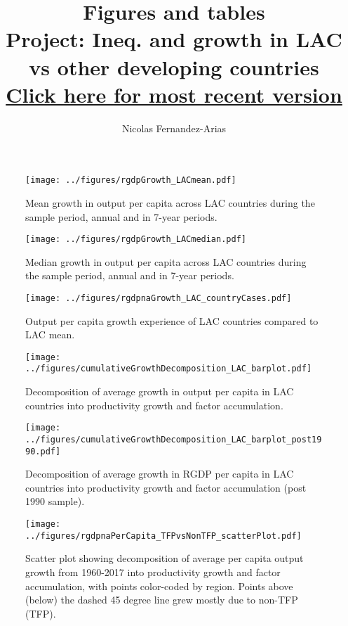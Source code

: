 \documentclass[12pt,english]{article}
\theoremstyle{remark}
\begin{document}
	
\title{Figures and tables\\ \small Project: Ineq. and growth in LAC vs other developing countries \\ \href{https://drive.google.com/open?id=1scBTr_BbYT9DM73woQAA136QVIfP6-Jr}{Click here for most recent version}}
\author{Nicolas Fernandez-Arias}
\maketitle

\begin{sidewaysfigure}[ht]
	\texttt{[image: ../figures/rgdpGrowth\_LACmean.pdf]}
	\caption{Mean growth in output per capita across LAC countries during the sample period, annual and in 7-year periods.}
\end{sidewaysfigure}

\begin{sidewaysfigure}[ht]
	\texttt{[image: ../figures/rgdpGrowth\_LACmedian.pdf]}
	\caption{Median growth in output per capita across LAC countries during the sample period, annual and in 7-year periods.}
\end{sidewaysfigure}

\begin{sidewaysfigure}[ht]
	\texttt{[image: ../figures/rgdpnaGrowth\_LAC\_countryCases.pdf]}
	\caption{Output per capita growth experience of LAC countries compared to LAC mean.}
\end{sidewaysfigure}

\begin{sidewaysfigure}[ht]
	\texttt{[image: ../figures/cumulativeGrowthDecomposition\_LAC\_barplot.pdf]}
	\caption{Decomposition of average growth in output per capita in LAC countries into productivity growth and factor accumulation.}
\end{sidewaysfigure}

\begin{sidewaysfigure}[ht]
	\texttt{[image: ../figures/cumulativeGrowthDecomposition\_LAC\_barplot\_post1990.pdf]}
	\caption{Decomposition of average growth in RGDP per capita in LAC countries into productivity growth and factor accumulation (post 1990 sample).}
\end{sidewaysfigure}

\begin{sidewaysfigure}[ht]
	\texttt{[image: ../figures/rgdpnaPerCapita\_TFPvsNonTFP\_scatterPlot.pdf]}
	\caption{Scatter plot showing decomposition of average per capita output growth from 1960-2017 into productivity growth and factor accumulation, with points color-coded by region. Points above (below) the dashed 45 degree line grew mostly due to non-TFP (TFP).}
\end{sidewaysfigure}
\end{document}
